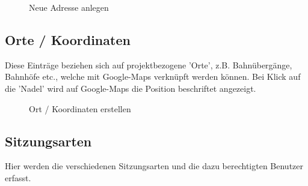 \begin{figure}[H]
\caption{Neue Adresse anlegen}
\end{figure}

\subsection{Orte / Koordinaten}

Diese Einträge beziehen sich auf projektbezogene 'Orte', z.B. Bahnübergänge, Bahnhöfe etc., welche mit Google-Maps verknüpft werden können. Bei Klick auf die 'Nadel' wird auf Google-Maps die Position beschriftet angezeigt.

\begin{figure}[H]
\caption{Ort / Koordinaten erstellen}
\end{figure}

\clearpage
\subsection{Sitzungsarten}

Hier werden die verschiedenen Sitzungsarten und die dazu berechtigten Benutzer erfasst.

